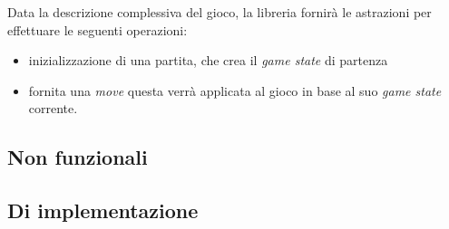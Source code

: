 Data la descrizione complessiva del gioco, la libreria fornirà le astrazioni per effettuare le seguenti operazioni:

\begin{itemize}
    \item inizializzazione di una partita, che crea il \textit{game state} di partenza
    \item fornita una \textit{move} questa verrà applicata al gioco in base al suo \textit{game state} corrente.
\end{itemize}

\subsection{Non funzionali}



\subsection{Di implementazione}


